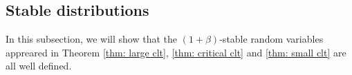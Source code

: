 \documentclass[12pt,a4paper]{amsart}
\theoremstyle{plain}
\newtheorem{lem}[thm]{Lemma}
\theoremstyle{definition}
\numberwithin{equation}{section}
\begin{document}
\subsection{Stable distributions}

    In this subsection, we will show that the $(1+\beta)$-stable random variables appreared in Theorem \ref{thm: large clt}, \ref{thm: critical clt} and \ref{thm: small clt} are all well defined.
\end{document}
